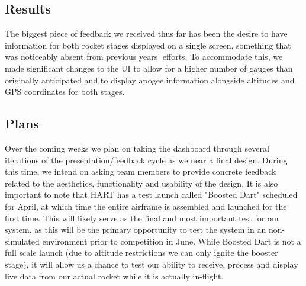 \documentclass[journal,10pt,onecolumn,compsoc]{IEEEtran}
\begin{document}
	\subsection{Results}
		The biggest piece of feedback we received thus far has been the desire to have information for both rocket stages displayed on a single screen, something that was noticeably absent from previous years' efforts.
		To accommodate this, we made significant changes to the UI to allow for a higher number of gauges than originally anticipated and to display apogee information alongside altitudes and GPS coordinates for both stages. 
	
	\subsection{Plans}
		Over the coming weeks we plan on taking the dashboard through several iterations of the presentation/feedback cycle as we near a final design.
		During this time, we intend on asking team members to provide concrete feedback related to the aesthetics, functionality and usability of the design.
		It is also important to note that HART has a test launch called "Boosted Dart" scheduled for April, at which time the entire airframe is assembled and launched for the first time.
		This will likely serve as the final and most important test for our system, as this will be the primary opportunity to test the system in an non-simulated environment prior to competition in June.
		While Boosted Dart is not a full scale launch (due to altitude restrictions we can only ignite the booster stage), it will allow us a chance to test our ability to receive, process and display live data from our actual rocket while it is actually in-flight.
		
\newpage


\end{document}
